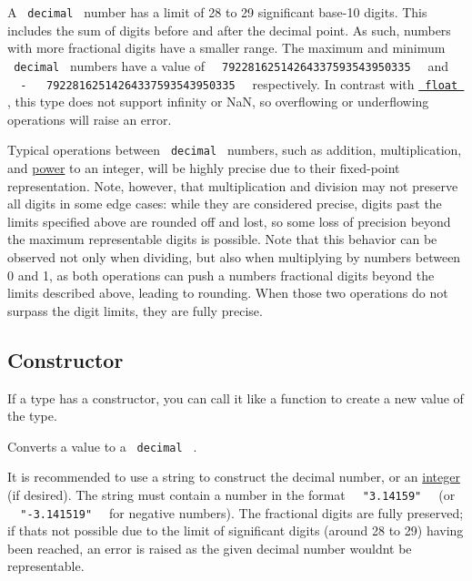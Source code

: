 A \texttt{\ decimal\ } number has a limit of 28 to 29 significant
base-10 digits. This includes the sum of digits before and after the
decimal point. As such, numbers with more fractional digits have a
smaller range. The maximum and minimum \texttt{\ decimal\ } numbers have
a value of
\texttt{\ }{\texttt{\ 79228162514264337593543950335\ }}\texttt{\ } and
\texttt{\ }{\texttt{\ -\ }}\texttt{\ }{\texttt{\ 79228162514264337593543950335\ }}\texttt{\ }
respectively. In contrast with
\href{/docs/reference/foundations/float/}{\texttt{\ float\ }} , this
type does not support infinity or NaN, so overflowing or underflowing
operations will raise an error.

Typical operations between \texttt{\ decimal\ } numbers, such as
addition, multiplication, and
\href{/docs/reference/foundations/calc/\#functions-pow}{power} to an
integer, will be highly precise due to their fixed-point representation.
Note, however, that multiplication and division may not preserve all
digits in some edge cases: while they are considered precise, digits
past the limits specified above are rounded off and lost, so some loss
of precision beyond the maximum representable digits is possible. Note
that this behavior can be observed not only when dividing, but also when
multiplying by numbers between 0 and 1, as both operations can push a
number\textquotesingle s fractional digits beyond the limits described
above, leading to rounding. When those two operations do not surpass the
digit limits, they are fully precise.

\subsection{\texorpdfstring{Constructor
{}}{Constructor }}\label{constructor}

\label{constructor-constructor-tooltip}
If a type has a constructor, you can call it like a function to create a
new value of the type.

Converts a value to a \texttt{\ decimal\ } .

It is recommended to use a string to construct the decimal number, or an
\href{/docs/reference/foundations/int/}{integer} (if desired). The
string must contain a number in the format
\texttt{\ }{\texttt{\ "3.14159"\ }}\texttt{\ } (or
\texttt{\ }{\texttt{\ "-3.141519"\ }}\texttt{\ } for negative numbers).
The fractional digits are fully preserved; if that\textquotesingle s not
possible due to the limit of significant digits (around 28 to 29) having
been reached, an error is raised as the given decimal number
wouldn\textquotesingle t be representable.

